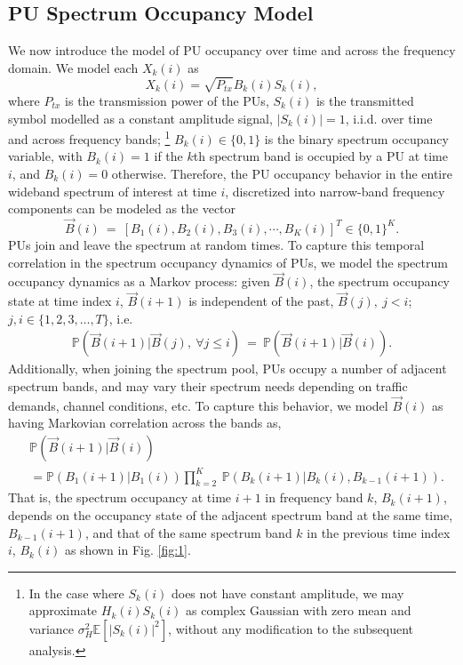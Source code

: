 \documentclass[10pt,twocolumn]{IEEEtran}
\begin{document}
\subsection{PU Spectrum Occupancy Model}
We now introduce the model of PU occupancy over time and across the frequency domain. We model each $X_k(i)$ as 
\begin{equation}\label{4}
    X_k(i)=\sqrt{P_{tx}}B_k(i)S_k(i),
\end{equation}
where $P_{tx}$ is the transmission power of the PUs, $S_k(i)$ is the transmitted symbol modelled as a constant amplitude signal, $|S_k(i)|=1$, i.i.d. over time and across frequency bands; \footnote{In the case where $S_k(i)$ does not have constant amplitude, we may approximate $H_{k}(i)S_{k}(i)$ as complex Gaussian with zero mean and variance $\sigma_H^2\mathbb E[|S_{k}(i)|^2]$, without any modification to the subsequent analysis.} $B_k(i)\in\{0,1\}$ is the binary spectrum occupancy variable, with $B_k(i)=1$ if the $k$th spectrum band is occupied by a PU at time $i$, and $B_k(i)=0$ otherwise. Therefore, the PU occupancy behavior in the entire wideband spectrum of interest at time $i$, discretized into narrow-band frequency components can be modeled as the vector 
\begin{equation}\label{5}
    \vec{B}(i)\ =\ [B_1(i),B_2(i),B_3(i),\cdots,B_K(i)]^T \in \{0,1\}^K.
\end{equation}
PUs join and leave the spectrum at random times. To capture this temporal correlation in the spectrum occupancy dynamics of PUs, we model the spectrum occupancy dynamics as a Markov process: given $\vec{B}(i)$, the spectrum occupancy state at time index $i$, $\vec{B}(i+1)$ is independent of the past, $\vec{B}(j),\ j < i$; $j, i \in \{1,2,3,\dots,T\}$, i.e. 
\begin{equation}\label{6}
    \begin{aligned}
        \mathbb{P}(\vec{B}(i+1)|\vec{B}(j),\ \forall j \leq i)\ =\ \mathbb{P}(\vec{B}(i+1)|\vec{B}(i)).
    \end{aligned}
\end{equation}
Additionally, when joining the spectrum pool, PUs occupy a number of adjacent spectrum bands, and may vary their spectrum needs depending on traffic demands, channel conditions, etc. To capture this behavior, we model $\vec{B}(i)$ as having Markovian correlation across the bands as, 
\begin{align}\label{7}
&         \mathbb{P}(\vec{B}(i+1)|\vec{B}(i))\\&=
\nonumber
         \mathbb{P}(B_{1}(i+1)|B_{1}(i))
         \prod_{k=2}^{K}\ \mathbb{P}(B_{k}(i+1)|B_{k}(i),B_{k-1}(i+1)).
\end{align}
That is, the spectrum occupancy at time $i+1$ in frequency band $k$, $B_{k}(i+1)$, depends on the  occupancy state of the adjacent spectrum band at the same time, $B_{k-1}(i+1)$, and that of the same spectrum band $k$ in the previous time index $i$, $B_{k}(i)$ as shown in Fig. \ref{fig:1}.
\end{document}
